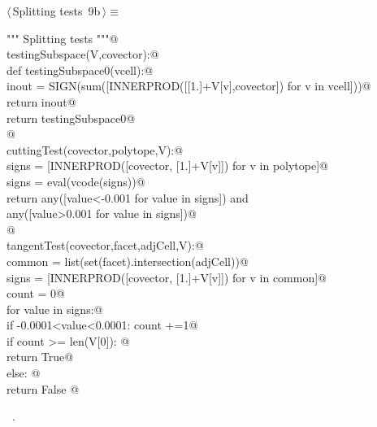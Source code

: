 \documentclass[11pt,oneside]{article}	%
\begin{document}
\begin{flushleft} \small \label{scrap8}
\protect{}$\langle\,$Splitting tests\nobreak\ {\footnotesize 9b}$\,\rangle\equiv$
\vspace{-1ex}
\begin{list}{}{} \item
\mbox{}\verb@""" Splitting tests """@\\
\mbox{}\verb@def testingSubspace(V,covector):@\\
\mbox{}\verb@   def testingSubspace0(vcell):@\\
\mbox{}\verb@      inout = SIGN(sum([INNERPROD([[1.]+V[v],covector]) for v in vcell]))@\\
\mbox{}\verb@      return inout@\\
\mbox{}\verb@   return testingSubspace0@\\
\mbox{}\verb@   @\\
\mbox{}\verb@def cuttingTest(covector,polytope,V):@\\
\mbox{}\verb@   signs = [INNERPROD([covector, [1.]+V[v]]) for v in polytope]@\\
\mbox{}\verb@   signs = eval(vcode(signs))@\\
\mbox{}\verb@   return any([value<-0.001 for value in signs]) and \@\\
\mbox{}\verb@         any([value>0.001 for value in signs])@\\
\mbox{}\verb@   @\\
\mbox{}\verb@def tangentTest(covector,facet,adjCell,V):@\\
\mbox{}\verb@   common = list(set(facet).intersection(adjCell))@\\
\mbox{}\verb@   signs = [INNERPROD([covector, [1.]+V[v]]) for v in common]@\\
\mbox{}\verb@   count = 0@\\
\mbox{}\verb@   for value in signs:@\\
\mbox{}\verb@      if -0.0001<value<0.0001: count +=1@\\
\mbox{}\verb@   if count >= len(V[0]): @\\
\mbox{}\verb@      return True@\\
\mbox{}\verb@   else: @\\
\mbox{}\verb@      return False   @\\
\mbox{}\verb@@{\NWsep}
\end{list}
\vspace{-1ex}
\footnotesize\addtolength{\baselineskip}{-1ex}
\begin{list}{}{\setlength{\itemsep}{-\parsep}\setlength{\itemindent}{-\leftmargin}}
\item \NWtxtMacroRefIn\ .
\end{list}
\end{flushleft}
\end{document}
